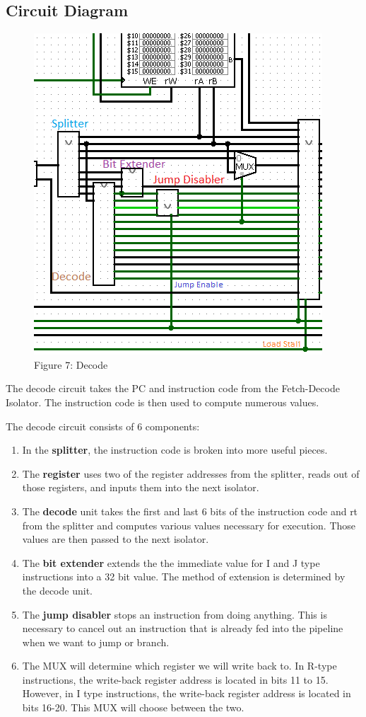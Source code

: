 \documentclass{article}
\begin{document}
\subsection{Circuit Diagram}
\begin{figure}
\vspace{-1.5cm}
\begin{center}
\includegraphics[width=.42\textwidth]{DecodeOut.png} \\
Figure 7: Decode
\end{center}
\vspace{-1.9cm}
\end{figure}
The decode circuit takes the PC and instruction code from the Fetch-Decode Isolator. The instruction code is then used to compute numerous values. 

The decode circuit consists of 6 components: 
\begin{enumerate}
\item
In the \textbf{splitter}, the instruction code is broken into more useful pieces.

\item
The \textbf{register} uses two of the register addresses from the splitter, reads out of those registers, and inputs them into the next isolator.

\item
The \textbf{decode} unit takes the first and last 6 bits of the instruction code and rt from the splitter and computes various values necessary for execution. Those values are then passed to the next isolator. 

\item
The \textbf{bit extender} extends the the immediate value for I and J type instructions into a 32 bit value. The method of extension is determined by the decode unit.
\end{enumerate}

\begin{enumerate}
\setcounter{enumi}{4}
\item
The \textbf{jump disabler} stops an instruction from doing anything. This is necessary to cancel out an instruction that is already fed into the pipeline when we want to jump or branch.

\item
The MUX will determine which register we will write back to. In R-type instructions, the write-back register address is located in bits 11 to 15. However, in I type instructions, the write-back register address is located in bits 16-20. This MUX will choose between the two.
\end{enumerate}
\end{document}
